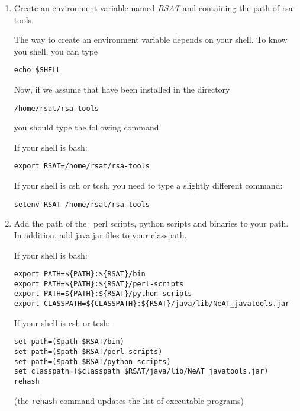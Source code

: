 \documentclass{book}
\begin{document}
\begin{enumerate}

\item Create an environment variable named \textit{RSAT} and
  containing the path of rsa-tools.

  The way to create an environment variable depends on your shell. To
  know you shell, you can type

\begin{footnotesize}
\begin{verbatim}
echo $SHELL
\end{verbatim}
\end{footnotesize}


Now, if we assume that \RSAT have been installed in the directory

\begin{footnotesize}
\begin{verbatim}
/home/rsat/rsa-tools
\end{verbatim}
\end{footnotesize}


you should type the following command.

If your shell is bash:
\begin{footnotesize}
\begin{verbatim}
export RSAT=/home/rsat/rsa-tools
\end{verbatim}
\end{footnotesize}


If your shell is csh or tcsh, you need to type a slightly different
command:

\begin{footnotesize}
\begin{verbatim}
setenv RSAT /home/rsat/rsa-tools
\end{verbatim}
\end{footnotesize}


\item Add the path of the \RSAT \ perl scripts, python scripts and
  binaries to your path. In addition, add java jar files to your
  classpath.

If your shell is bash:
\begin{footnotesize}
\begin{verbatim}
export PATH=${PATH}:${RSAT}/bin
export PATH=${PATH}:${RSAT}/perl-scripts
export PATH=${PATH}:${RSAT}/python-scripts
export CLASSPATH=${CLASSPATH}:${RSAT}/java/lib/NeAT_javatools.jar
\end{verbatim}
\end{footnotesize}


If your shell is csh or tcsh:
\begin{footnotesize}
\begin{verbatim}
set path=($path $RSAT/bin)
set path=($path $RSAT/perl-scripts)
set path=($path $RSAT/python-scripts)
set classpath=($classpath $RSAT/java/lib/NeAT_javatools.jar)
rehash
\end{verbatim}
\end{footnotesize}


(the \texttt{rehash} command updates the list of executable programs)

\end{enumerate}
\end{document}
